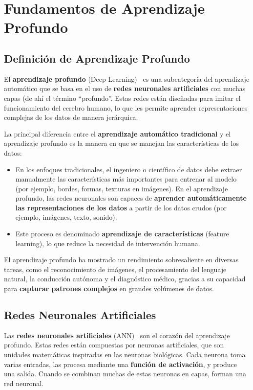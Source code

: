 
\chapter{Fundamentos de Aprendizaje Profundo}\label{ch:fundamentos-de-aprendizaje-profundo}
\section{Definición de Aprendizaje Profundo}\label{sec:definicion-de-aprendizaje-profundo}
El \textbf{aprendizaje profundo} (Deep Learning)~\cite{weidmanDeepLearningScratch2019} es una subcategoría del aprendizaje
automático que se basa en el uso de \textbf{redes neuronales artificiales} con muchas capas (de ahí el término
``profundo''.
Estas redes están diseñadas para imitar el funcionamiento del cerebro humano, lo que les permite aprender
representaciones complejas de los datos de manera jerárquica.


La principal diferencia entre el \textbf{aprendizaje automático tradicional} y el aprendizaje profundo es la manera en
que se manejan las características de los datos:
\begin{itemize}
    \item En los enfoques tradicionales, el ingeniero o científico de datos debe extraer manualmente las
          características más importantes para entrenar al modelo (por ejemplo, bordes, formas, texturas en imágenes).
          En el aprendizaje profundo, las redes neuronales son capaces de
          \textbf{aprender automáticamente las representaciones de los datos} a partir de los datos crudos (por ejemplo,
          imágenes, texto, sonido).
    \item Este proceso es denominado \textbf{aprendizaje de características} (feature learning), lo que reduce la
          necesidad de intervención humana.
\end{itemize}

El aprendizaje profundo ha mostrado un rendimiento sobresaliente en diversas tareas, como el reconocimiento de
imágenes, el procesamiento del lenguaje natural, la conducción autónoma y el diagnóstico médico, gracias a su capacidad
para \textbf{capturar patrones complejos} en grandes volúmenes de datos.

\section{Redes Neuronales Artificiales}\label{sec:redes-neuronales-artificiales}
Las \textbf{redes neuronales artificiales} (ANN)~\cite{sydenhamHandbookMeasuringSystem2005} son el corazón del aprendizaje profundo.
Estas redes están compuestas por neuronas artificiales, que son unidades matemáticas inspiradas en las neuronas
biológicas.
Cada neurona toma varias entradas, las procesa mediante una \textbf{función de activación}, y produce una salida.
Cuando se combinan muchas de estas neuronas en capas, forman una red neuronal.

